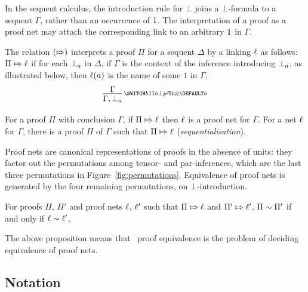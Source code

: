 \documentclass[conference,onecolumn]{IEEEtran}
\begin{document}
\noindent
In the sequent calculus, the introduction rule for $\bot$ joins a $\bot$-formula to a sequent $\Gamma$, rather than an occurrence of $1$.
%
The interpretation of a proof as a proof net may attach the corresponding link to an arbitrary $1$ in $\Gamma$.


\begin{definition}
\label{def:proofs to nets}
%
The relation $(\Mapsto)$ interprets a proof $\Pi$ for a sequent $\Delta$ by a linking $\ell$ as follows:
% 
$\Pi\Mapsto\ell$ if for each $\bot_{a}$ in $\Delta$, if $\Gamma$ is the context of the inference introducing $\bot_{a}$, as illustrated below, then $\ell(a)$ is the name of some $1$ in $\Gamma$.
\[
	\infer[\MLLlabel b]{\Gamma,\named a\bot}{\Gamma}
\]
%
\end{definition}



\begin{proposition}[\cite{DR89}]
\label{prop:correctness and sequentialisation}
%
For a proof $\Pi$ with conclusion $\Gamma$, if $\Pi\Mapsto\ell$ then $\ell$ is a proof net for $\Gamma$.
%
For a net $\ell$ for $\Gamma$, there is a proof $\Pi$ of $\Gamma$ such that $\Pi\Mapsto\ell$ (\emph{sequentialisation}).
%
\end{proposition}


\noindent
Proof nets are canonical representations of proofs in the absence of units: they factor out the permutations among tensor- and par-inferences, which are the last three permutations in Figure~\ref{fig:permutations}.
%
Equivalence of proof nets is generated by the four remaining permutations, on $\bot$-introduction.



\begin{proposition}[\cite{HughesMLLProofNets}] %
\label{prop:proof nets work}
%
For proofs $\Pi$, $\Pi'$ and proof nets $\ell$, $\ell'$ such that $\Pi\Mapsto\ell$ and $\Pi'\Mapsto\ell'$, $\Pi\perm\Pi'$ if and only if $\links\perm\links'$.
%
\end{proposition}


\noindent
The above proposition means that \MLL\ proof equivalence is the problem of deciding equivalence of proof nets.




\subsection*{Notation}
\end{document}
